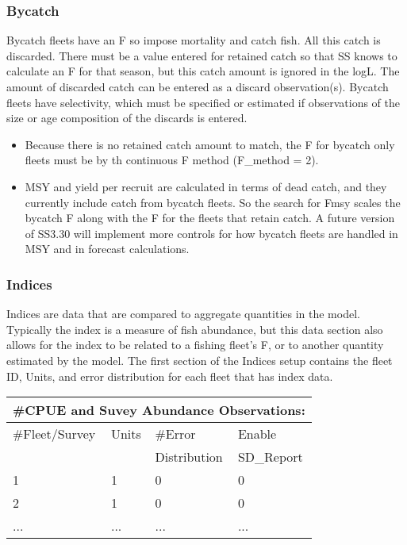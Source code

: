 \subsubsection{Bycatch}
Bycatch fleets have an F so impose mortality and catch fish.  All this catch is discarded.  There must be a value entered for retained catch so that SS knows to calculate an F for that season, but this catch amount is ignored in the logL.  The amount of discarded catch can be entered as a discard observation(s).  Bycatch fleets have selectivity, which must be specified or estimated if observations of the size or age composition of the discards is entered.
\begin{itemize}
	\item Because there is no retained catch amount to match, the F for bycatch only fleets must be by th continuous F method  (F\_method = 2).
	\item  MSY and yield per recruit are calculated in terms of dead catch, and they currently include catch from bycatch fleets.  So the search for Fmsy scales the bycatch F along with the F for the fleets that retain catch.  A future version of SS3.30 will implement more controls for how bycatch fleets are handled in MSY and in forecast calculations. 
\end{itemize}

\subsubsection{Indices}
Indices are data that are compared to aggregate quantities in the model.  Typically the index is a measure of fish abundance, but this data section also allows for the index to be related to a fishing fleet's F, or to another quantity estimated by the model.  The first section of the Indices setup contains the fleet ID, Units, and error distribution for each fleet that has index data.

\begin{center}
	\begin{tabular}{p{3cm} p{2cm} p{3cm} p{3cm}}
		\multicolumn{4}{l}{\#CPUE and Suvey Abundance Observations:}\\
		\hline
		\#Fleet/Survey & Units & \#Error      & Enable \\
		               &       & Distribution & SD\_Report \\
		\hline
		1 & 1 & 0 & 0 \\
		2 & 1 & 0 & 0 \\
		... & ... & ... & ... \\
		\hline
	\end{tabular}		
\end{center}

